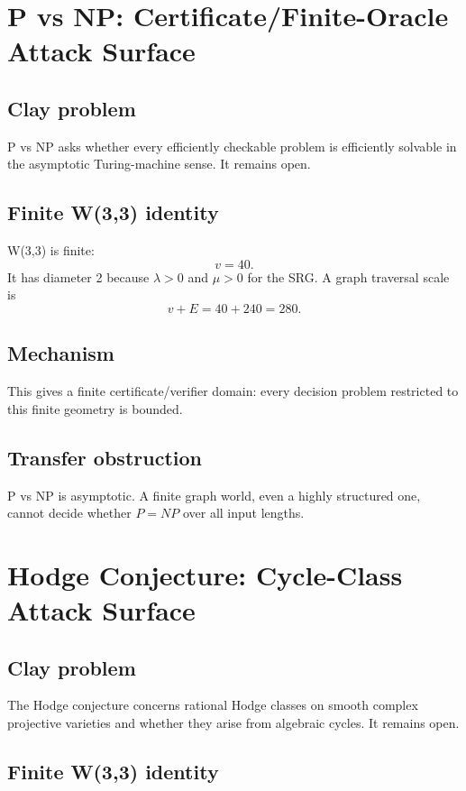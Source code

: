 \documentclass[11pt]{article}
\theoremstyle{definition}
\begin{document}
\section{P vs NP: Certificate/Finite-Oracle Attack Surface}

\subsection{Clay problem}

P vs NP asks whether every efficiently checkable problem is efficiently solvable in the asymptotic Turing-machine sense.  It remains open.

\subsection{Finite W(3,3) identity}

W(3,3) is finite:
\[
  v=40.
\]
It has diameter 2 because \(\lambda>0\) and \(\mu>0\) for the SRG.  A graph traversal scale is
\[
  v+E=40+240=280.
\]

\subsection{Mechanism}

This gives a finite certificate/verifier domain: every decision problem restricted to this finite geometry is bounded.

\subsection{Transfer obstruction}

P vs NP is asymptotic.  A finite graph world, even a highly structured one, cannot decide whether \(P=NP\) over all input lengths.

\section{Hodge Conjecture: Cycle-Class Attack Surface}

\subsection{Clay problem}

The Hodge conjecture concerns rational Hodge classes on smooth complex projective varieties and whether they arise from algebraic cycles.  It remains open.

\subsection{Finite W(3,3) identity}
\end{document}
